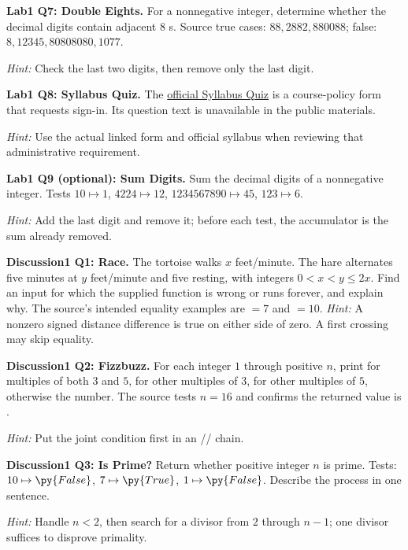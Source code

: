 \begin{prob}
\textbf{Lab1 Q7: Double Eights.} For a nonnegative integer, determine whether the decimal digits contain adjacent $8$ s. Source true cases: $88,2882,880088$; false: $8,12345,80808080,1077$.\par
\emph{Hint:} Check the last two digits, then remove only the last digit.
\end{prob}
\begin{prob}
\textbf{Lab1 Q8: Syllabus Quiz.} The \href{https://docs.google.com/forms/d/e/1FAIpQLSdF_ze5dj1Iy5AyqCFkgk37dbThV8GnYqC7JI4e5tOH_X4RWQ/viewform}{official Syllabus Quiz} is a course-policy form that requests sign-in. Its question text is unavailable in the public materials.\par
\emph{Hint:} Use the actual linked form and official syllabus when reviewing that administrative requirement.
\end{prob}
\begin{prob}
\textbf{Lab1 Q9 (optional): Sum Digits.} Sum the decimal digits of a nonnegative integer. Tests $10\mapsto1$, $4224\mapsto12$, $1234567890\mapsto45$, $123\mapsto6$.\par
\emph{Hint:} Add the last digit and remove it; before each test, the accumulator is the sum already removed.
\end{prob}
\begin{prob}
\textbf{Discussion1 Q1: Race.} The tortoise walks $ x $ feet/minute. The hare alternates five minutes at $ y $ feet/minute and five resting, with integers $0<x<y\le2x $. Find an input for which the supplied function is wrong or runs forever, and explain why. The source's intended equality examples are $=7$ and $=10$.
\emph{Hint:} A nonzero signed distance difference is true on either side of zero. A first crossing may skip equality.
\end{prob}
\begin{prob}
\textbf{Discussion1 Q2: Fizzbuzz.} For each integer $1$ through positive $ n $, print  for multiples of both $3$ and $5$,  for other multiples of $3$,  for other multiples of $5$, otherwise the number. The source tests $ n=16$ and confirms the returned value is .\par
\emph{Hint:} Put the joint condition first in an // chain.
\end{prob}
\begin{prob}
\textbf{Discussion1 Q3: Is Prime?} Return whether positive integer $ n $ is prime. Tests: $10\mapsto\py{False}$, $7\mapsto\py{True}$, $1\mapsto\py{False}$. Describe the process in one sentence.\par
\emph{Hint:} Handle $ n<2$, then search for a divisor from $2$ through $ n-1$; one divisor suffices to disprove primality.
\end{prob}
